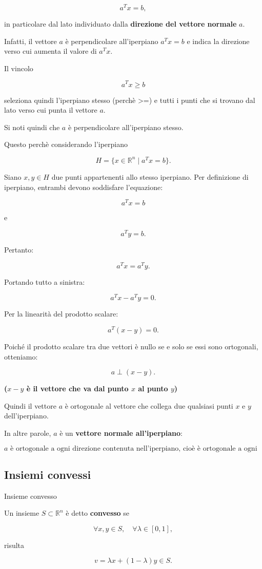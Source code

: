 $$
a^Tx=b,
$$

in particolare dal lato individuato dalla \textbf{direzione del vettore normale} $a$.

Infatti, il vettore $a$ è perpendicolare all'iperpiano $a^Tx=b$ e indica la direzione verso cui aumenta il valore di $a^Tx$.

Il vincolo

$$
a^Tx\geq b
$$

seleziona quindi l'iperpiano stesso (perchè >=) e tutti i punti che si trovano dal lato verso cui punta il vettore $a$.

Si noti quindi che $a$ è perpendicolare all'iperpiano stesso.

Questo perchè considerando l'iperpiano

$$
H=\{x\in\mathbb{R}^n\mid a^Tx=b\}.
$$

Siano $x,y\in H$ due punti appartenenti allo stesso iperpiano. Per definizione di iperpiano, entrambi devono soddisfare l'equazione:

$$
a^Tx=b
$$

e

$$
a^Ty=b.
$$

Pertanto:

$$
a^Tx=a^Ty.
$$

Portando tutto a sinistra:

$$
a^Tx-a^Ty=0.
$$

Per la linearità del prodotto scalare:

$$
a^T(x-y)=0.
$$

Poiché il prodotto scalare tra due vettori è nullo se e solo se essi sono ortogonali, otteniamo:

$$
a\perp(x-y).
$$

\textbf{($x-y$ è il vettore che va dal punto $x$ al punto $y$)}

Quindi il vettore $a$ è ortogonale al vettore che collega due qualsiasi punti $x$ e $y$ dell'iperpiano.

In altre parole, $a$ è un \textbf{vettore normale all'iperpiano}:

$$
\boxed{a\text{ è ortogonale a ogni direzione contenuta nell'iperpiano, cioè è ortogonale a ogni vettore giacente sul piano.}}
$$

\subsection{Insiemi convessi}

\begin{definition}{Insieme convesso}

Un insieme $S\subset\mathbb{R}^n$ è detto \textbf{convesso} se

$$
\forall x,y\in S,\quad \forall\lambda\in[0,1],
$$

risulta

$$
v = \lambda x+(1-\lambda)y\in S.
$$

\end{definition}

